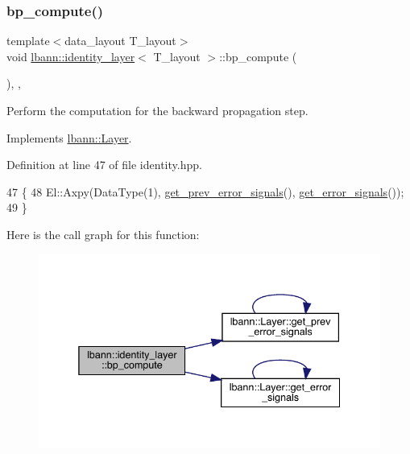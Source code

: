 \subsubsection{\texorpdfstring{bp\+\_\+compute()}{bp\_compute()}}
{\footnotesize\ttfamily template$<$data\+\_\+layout T\+\_\+layout$>$ \\
void \hyperlink{classlbann_1_1identity__layer}{lbann\+::identity\+\_\+layer}$<$ T\+\_\+layout $>$\+::bp\+\_\+compute (\begin{DoxyParamCaption}{ }\end{DoxyParamCaption})\hspace{0.3cm}{\ttfamily [inline]}, {\ttfamily [override]}, {\ttfamily [virtual]}}

Perform the computation for the backward propagation step. 

Implements \hyperlink{classlbann_1_1Layer_a7442e01f9ee1294df2de811efcf5171e}{lbann\+::\+Layer}.



Definition at line 47 of file identity.\+hpp.


\begin{DoxyCode}
47                              \{
48     El::Axpy(DataType(1), \hyperlink{classlbann_1_1Layer_a7ac4579d3c1671dfaf86e3b618d6938a}{get\_prev\_error\_signals}(), 
      \hyperlink{classlbann_1_1Layer_adb561e140e0bb601f3c5a8ee053a71d2}{get\_error\_signals}());
49   \}
\end{DoxyCode}
Here is the call graph for this function\+:\nopagebreak
\begin{figure}[H]
\begin{center}
\leavevmode
\includegraphics[width=338pt]{classlbann_1_1identity__layer_a1f6c975af032caea84155bda8b9c9801_cgraph}
\end{center}
\end{figure}
\mbox{\label{classlbann_1_1identity__layer_ac9407c3e6f576eb2c3b873f37daed159}} 
